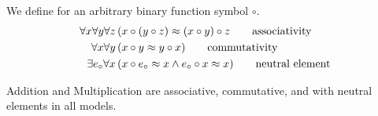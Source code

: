 \begin{definition}[x]
	We define for an arbitrary binary function symbol $\circ$.
	\begin{align*}
	\forall x\forall y\forall z\,&(x\circ(y\circ z) \approx (x\circ y)\circ z 
	\tag*{associativity}
	\\
	\forall x\forall y\,&(x\circ y \approx y\circ x)
	\tag*{commutativity}
	\\
	\exists e_\circ\forall x\,&(x\circ e_\circ\approx x \land e_\circ \circ x \approx x )
	\tag*{neutral element}
	\end{align*}
	
\end{definition}

\begin{lemma}
	Addition and Multiplication are associative, commutative, and with neutral elements in all models.
\end{lemma}












